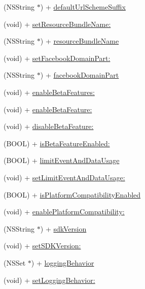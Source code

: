 \begin{DoxyCompactItemize}
\item 
(N\+S\+String $\ast$) + \hyperlink{interfaceFBSettings_ae7709bddfea2d7cf28ad5e91f769dc9b}{default\+Url\+Scheme\+Suffix}
\item 
(void) + \hyperlink{interfaceFBSettings_a60a15470e22d07ad1c7d4a789712e3c1}{set\+Resource\+Bundle\+Name\+:}
\item 
(N\+S\+String $\ast$) + \hyperlink{interfaceFBSettings_ad87ff4e3c9577a22d9a329b12137f976}{resource\+Bundle\+Name}
\item 
(void) + \hyperlink{interfaceFBSettings_a4cfd61825c72f8a5978cb07ba84983d1}{set\+Facebook\+Domain\+Part\+:}
\item 
(N\+S\+String $\ast$) + \hyperlink{interfaceFBSettings_a7ce923f25dd500f81ce518e998bf2f39}{facebook\+Domain\+Part}
\item 
(void) + \hyperlink{interfaceFBSettings_a9ce6bc977fc54c59ba5cacf56922ccac}{enable\+Beta\+Features\+:}
\item 
(void) + \hyperlink{interfaceFBSettings_a390b436e1de87f3d49979a6aa98e14b1}{enable\+Beta\+Feature\+:}
\item 
(void) + \hyperlink{interfaceFBSettings_a6cc67de9d4b0069de4bfc6a3872f7114}{disable\+Beta\+Feature\+:}
\item 
(B\+O\+OL) + \hyperlink{interfaceFBSettings_a16d812cddbf44b8d354393d68757945f}{is\+Beta\+Feature\+Enabled\+:}
\item 
(B\+O\+OL) + \hyperlink{interfaceFBSettings_a3a939ba08bcff55d53c8e42f9a9e0234}{limit\+Event\+And\+Data\+Usage}
\item 
(void) + \hyperlink{interfaceFBSettings_ab0e8e19825a865db7cbf58da4957cf40}{set\+Limit\+Event\+And\+Data\+Usage\+:}
\item 
(B\+O\+OL) + \hyperlink{interfaceFBSettings_a257796e070b7f063dedaa95706946134}{is\+Platform\+Compatibility\+Enabled}
\item 
(void) + \hyperlink{interfaceFBSettings_a896c1bdd4227035fba49c90d06c101a2}{enable\+Platform\+Compatibility\+:}
\item 
(N\+S\+String $\ast$) + \hyperlink{interfaceFBSettings_a54528a8eee1469b7202d0e4825f08604}{sdk\+Version}
\item 
(void) + \hyperlink{interfaceFBSettings_afd9810381ac6027e6400879cb68ba46e}{set\+S\+D\+K\+Version\+:}
\item 
(N\+S\+Set $\ast$) + \hyperlink{interfaceFBSettings_a6fe525188c97270c4d4a6781c4d6ee11}{logging\+Behavior}
\item 
(void) + \hyperlink{interfaceFBSettings_aaaf513653d6a8e2d05e0ecea865155c0}{set\+Logging\+Behavior\+:}

\end{DoxyCompactItemize}
